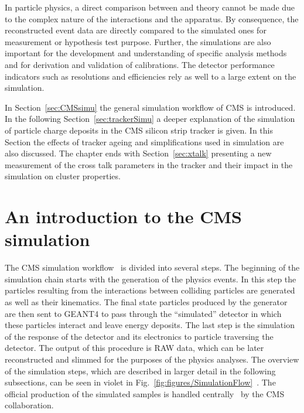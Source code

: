 
\clearpage

\setcounter{secnumdepth}{4}
\setcounter{secnumdepth}{5}

In particle physics, a direct comparison between and theory cannot be made due to the complex nature of the interactions and the apparatus. By consequence, the reconstructed event data are directly compared to the simulated ones for measurement or hypothesis test purpose. Further, the simulations are also important for the development and understanding of specific analysis methods and for derivation and validation of calibrations. The detector performance indicators such as resolutions and efficiencies rely as well to a large extent on the simulation.

In Section~\ref{sec:CMSsimu} the general simulation workflow of CMS is introduced. In the following Section~\ref{sec:trackerSimu} a deeper explanation of the simulation of particle charge deposits in the CMS silicon strip tracker is given. In this Section the effects of tracker ageing and simplifications used in simulation are also discussed. The chapter ends with Section~\ref{sec:xtalk} presenting a new measurement of the cross talk parameters in the tracker and their impact in the simulation on cluster properties.

\section{An introduction to the CMS simulation~\label{sec:CMSsimu}}

The CMS simulation workflow~\cite{Banerjee:2007zz, Hildreth:2017vpw, Hildreth:2015kps} is divided into several steps. The beginning of the simulation chain starts with the generation of the physics events. In this step the  particles resulting from the interactions between colliding particles are generated as well as their kinematics. The final state particles produced by the generator are then sent to GEANT4 to pass through the ``simulated'' detector in which these particles interact and leave energy deposits. The last step is the simulation of the response of the detector and its electronics to particle traversing the detector. The output of this procedure is RAW data, which can be later reconstructed and slimmed for the purposes of the physics analyses. The overview of the simulation steps, which are described in larger detail in the following subsections, can be seen in violet in Fig.~\ref{fig:figures/SimulationFlow}~\cite{website:simuBasics}. The official production of the simulated samples is handled centrally~\cite{Boudoul:2015bkp} by the CMS collaboration.

